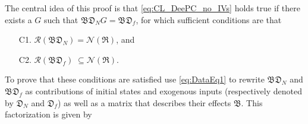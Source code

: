 The central idea of this proof is that \eqref{eq:CL_DeePC_no_IVs} holds true if there exists a $G$ such that $\mathfrak{BD}_N G=\mathfrak{BD}_f$, for which sufficient conditions are that
\begin{enumerate}
    \item[C1.] $\mathcal{R}(\mathfrak{BD}_N)=\mathcal{N}(\mathfrak{R})$, and
    \item[C2.] $\mathcal{R}(\mathfrak{BD}_f)\;\subseteq\mathcal{N}(\mathfrak{R})$.
\end{enumerate}
To prove that these conditions are satisfied use \eqref{eq:DataEq1} to rewrite $\mathfrak{BD}_N$ and $\mathfrak{BD}_f$ as contributions of initial states and exogenous inputs (respectively denoted by $\mathfrak{D}_N$ and $\mathfrak{D}_f$) as well as a matrix that describes their effects $\mathfrak{B}$. This factorization is given by
